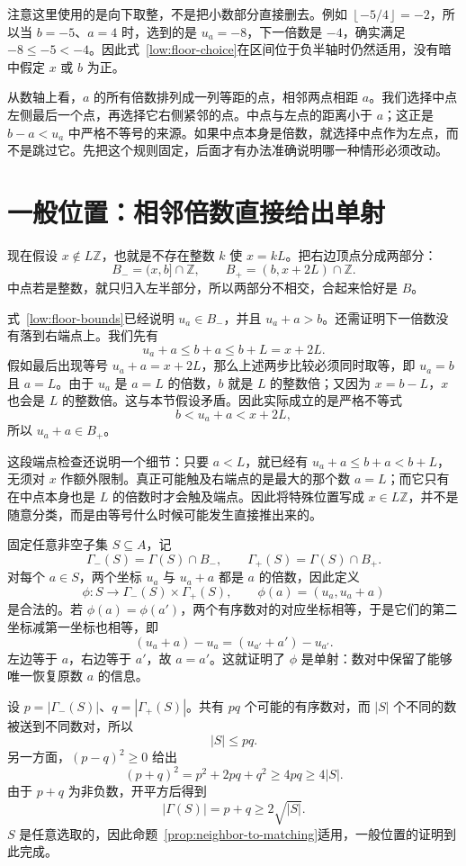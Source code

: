 \documentclass[UTF8,a4paper,oneside,openany,fontset=fandol,zihao=-4]{ctexbook}
\theoremstyle{guide}
\newcommand{\Z}{\mathbb Z}
\newcommand{\floor}[1]{\left\lfloor#1\right\rfloor}
\begin{document}
注意这里使用的是向下取整，不是把小数部分直接删去。例如 $\floor{-5/4}=-2$，所以当 $b=-5$、$a=4$ 时，选到的是 $u_a=-8$，下一倍数是 $-4$，确实满足 $-8\leq-5<-4$。因此式~\eqref{low:floor-choice}在区间位于负半轴时仍然适用，没有暗中假定 $x$ 或 $b$ 为正。

从数轴上看，$a$ 的所有倍数排列成一列等距的点，相邻两点相距 $a$。我们选择中点左侧最后一个点，再选择它右侧紧邻的点。中点与左点的距离小于 $a$；这正是 $b-a<u_a$ 中严格不等号的来源。如果中点本身是倍数，就选择中点作为左点，而不是跳过它。先把这个规则固定，后面才有办法准确说明哪一种情形必须改动。

\section{一般位置：相邻倍数直接给出单射}

现在假设 $x\notin L\Z$，也就是不存在整数 $k$ 使 $x=kL$。把右边顶点分成两部分：
\[
  B_-=(x,b]\cap\Z,\qquad
  B_+=(b,x+2L)\cap\Z.
\]
中点若是整数，就只归入左半部分，所以两部分不相交，合起来恰好是 $B$。

式~\eqref{low:floor-bounds}已经说明 $u_a\in B_-$，并且 $u_a+a>b$。还需证明下一倍数没有落到右端点上。我们先有
\[
  u_a+a\leq b+a\leq b+L=x+2L.
\]
假如最后出现等号 $u_a+a=x+2L$，那么上述两步比较必须同时取等，即 $u_a=b$ 且 $a=L$。由于 $u_a$ 是 $a=L$ 的倍数，$b$ 就是 $L$ 的整数倍；又因为 $x=b-L$，$x$ 也会是 $L$ 的整数倍。这与本节假设矛盾。因此实际成立的是严格不等式
\[
  b<u_a+a<x+2L,
\]
所以 $u_a+a\in B_+$。

这段端点检查还说明一个细节：只要 $a<L$，就已经有 $u_a+a\leq b+a<b+L$，无须对 $x$ 作额外限制。真正可能触及右端点的是最大的那个数 $a=L$；而它只有在中点本身也是 $L$ 的倍数时才会触及端点。因此将特殊位置写成 $x\in L\Z$，并不是随意分类，而是由等号什么时候可能发生直接推出来的。

固定任意非空子集 $S\subseteq A$，记
\[
  \Gamma_-(S)=\Gamma(S)\cap B_-,\qquad
  \Gamma_+(S)=\Gamma(S)\cap B_+.
\]
对每个 $a\in S$，两个坐标 $u_a$ 与 $u_a+a$ 都是 $a$ 的倍数，因此定义
\[
  \phi:S\longrightarrow\Gamma_-(S)\times\Gamma_+(S),
  \qquad \phi(a)=(u_a,u_a+a)
\]
是合法的。若 $\phi(a)=\phi(a')$，两个有序数对的对应坐标相等，于是它们的第二坐标减第一坐标也相等，即
\[
  (u_a+a)-u_a=(u_{a'}+a')-u_{a'}.
\]
左边等于 $a$，右边等于 $a'$，故 $a=a'$。这就证明了 $\phi$ 是单射：数对中保留了能够唯一恢复原数 $a$ 的信息。

设 $p=|\Gamma_-(S)|$、$q=|\Gamma_+(S)|$。共有 $pq$ 个可能的有序数对，而 $|S|$ 个不同的数被送到不同数对，所以
\[
  |S|\leq pq.
\]
另一方面，$(p-q)^2\geq0$ 给出
\[
  (p+q)^2=p^2+2pq+q^2\geq4pq\geq4|S|.
\]
由于 $p+q$ 为非负数，开平方后得到
\[
  |\Gamma(S)|=p+q\geq2\sqrt{|S|}.
\]
$S$ 是任意选取的，因此命题~\ref{prop:neighbor-to-matching}适用，一般位置的证明到此完成。
\end{document}
